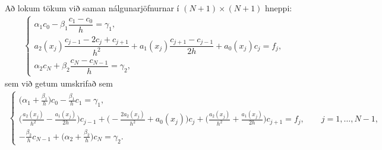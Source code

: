 \documentclass[a4paper,10pt,icelandic]{sphinxmanual}
\begin{document}
Að lokum tökum við saman nálgunarjöfnurnar í \((N+1)\times(N+1)\) hneppi:
\begin{equation*}
\begin{split}\begin{cases}
\alpha_1c_0-\beta_1\dfrac{c_1-c_0}h= \gamma_1,\\
a_2(x_j)\dfrac{c_{j-1}-2c_j+c_{j+1}}{h^2}+a_1(x_j)
\dfrac{c_{j+1}-c_{j-1}}{2h}+a_0(x_j)c_j=f_j,\\
\alpha_2c_N+\beta_2\dfrac{c_N-c_{N-1}}h = \gamma_2,
\end{cases}\end{split}
\end{equation*}
sem við getum umskrifað sem
\begin{equation}\label{equation:Kafli05:eq.firstapprox}
\begin{split}\begin{cases}
\big(\alpha_1+\tfrac {\beta_1}h\big)c_0
-\tfrac {\beta_1}h c_1= \gamma_1,\\
\big(\tfrac{a_2(x_j)}{h^2}-\tfrac{a_1(x_j)}{2h}\big) c_{j-1}
+\big(-\tfrac{2a_2(x_j)}{h^2}+a_0(x_j)\big)c_j
+\big(\tfrac{a_2(x_j)}{h^2}+\tfrac{a_1(x_j)}{2h}\big) c_{j+1} =f_j, \qquad j=1, \dots, N-1,\\
-\tfrac{\beta_2}h c_{N-1}+\big(\alpha_2+\tfrac{\beta_2}h \big) c_N = \gamma_2.
\end{cases}\end{split}
\end{equation}
\end{document}
